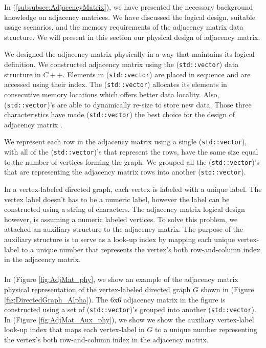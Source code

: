 {In (\ref{subsubsec:AdjacencyMatrix}), we have presented the necessary background knowledge on adjacency matrices. We have discussed the logical design, suitable usage scenarios, and the memory requirements of the adjacency matrix data structure. We will present in this section our physical design of adjacency matrix.

We designed the adjacency matrix physically in a way that maintains its logical definition. We constructed adjacency matrix using the (\texttt{std::vector}) data structure in $C++$. Elements in (\texttt{std::vector}) are placed in sequence and are accessed using their index. The (\texttt{std::vector}) allocates its elements in consecutive memory locations which offers better data locality. Also, (\texttt{std::vector})'s are able to dynamically re-size to store new data. Those three characteristics have made (\texttt{std::vector}) the best choice for the design of adjacency matrix \cite{josuttis2012c++}.

We represent each row in the adjacency matrix using a single (\texttt{std::vector}), with all of the (\texttt{std::vector})'s that represent the rows, have the same size equal to the number of vertices forming the graph. We grouped all the (\texttt{std::vector})'s that are representing the adjacency matrix rows into another (\texttt{std::vector}).

In a vertex-labeled directed graph, each vertex is labeled with a unique label. The vertex label doesn't has to be a numeric label, however the label can be constructed using a string of characters. The adjacency matrix logical design however, is assuming a numeric labeled vertices. To solve this problem, we attached an auxiliary structure to the adjacency matrix. The purpose of the auxiliary structure is to serve as a look-up index by mapping each unique vertex-label to a unique number that represents the vertex's both row-and-column index in the adjacency matrix.
\\
\\

In (Figure \ref{fig:AdjMat_phy}, we show an example of the adjacency matrix physical representation of the vertex-labeled directed graph $G$ shown in (Figure \ref{fig:DirectedGraph_Alpha}). The 6x6 adjacency matrix in the figure is constructed using a set of (\texttt{std::vector})'s grouped into another (\texttt{std::vector}). In (Figure \ref{fig:AdjMat_Aux_phy}), we show we show the auxiliary vertex-label look-up index that maps each vertex-label in $G$ to a unique number representing the vertex's both row-and-column index in the adjacency matrix.



}
